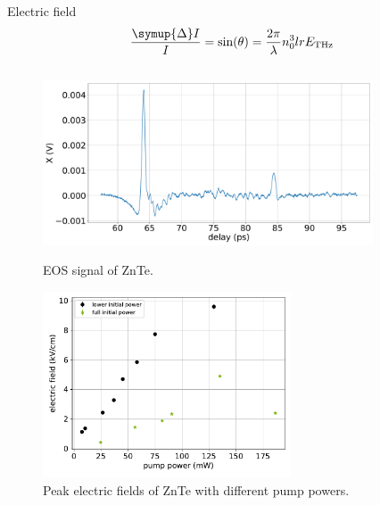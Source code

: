 \documentclass[aspectratio=1610, 9pt]{beamer}
\begin{document}
\begin{frame}{Electric field}
  \begin{equation}
    \frac{\symup{\Delta}I}{I} = \text{sin}(\theta) = \frac{2\pi}{\lambda} n_0^3 l r E_\text{THz}
  \end{equation}
  \begin{center}
  \begin{columns}
    \begin{column}{.5\textwidth}
      \begin{figure}
        \begin{overprint}
          \includegraphics[width=\textwidth]{images/2_11_30_20normalX.pdf}\caption{EOS signal of ZnTe.}
          \includegraphics[width=0.75\textwidth]{images/eltric_field_ZnTe.pdf}\caption{Peak electric fields of ZnTe with different pump powers.}
        \end{overprint}
      \end{figure}
  \end{column}
  \begin{column}{.5\textwidth}
    \begin{figure}
      \begin{overprint}

\end{overprint}
\end{figure}
\end{column}
\end{columns}
\end{center}
\end{frame}
\end{document}
